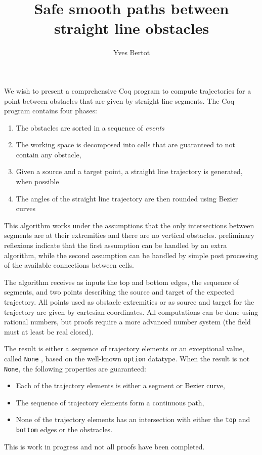 \documentclass{easychair}
\title{Safe smooth paths between straight line obstacles}
\author{Yves Bertot}
\institute{Inria Université Côte d'Azur}
\begin{document}
\maketitle
We wish to present a comprehensive Coq program
to compute trajectories for a point between obstacles that are given by straight
line segments.  The Coq program contains four phases:
\begin{enumerate}
\item The obstacles are sorted in a sequence of {\em events}
\item The working space is decomposed into cells that are guaranteed to not contain
 any obstacle,
\item Given a source and a target point, a straight line trajectory is generated,
when possible
\item The angles of the straight line trajectory are then rounded using Bezier curves
\end{enumerate}
This algorithm works under the assumptions that the only intersections between segments
are at their extremities and there are no vertical obstacles.  preliminary reflexions
indicate that the first assumption can be handled by an extra algorithm, while
the second assumption can be handled by simple post processing of the available
connections between cells.

The algorithm receives as inputs the top and bottom edges, the sequence of segments,
and two points describing the source and target of the expected trajectory.  All
points used as obstacle extremities or as source and target for the trajectory are
given by cartesian coordinates.  All computations can be done using rational numbers,
but proofs require a more advanced number system (the field must at least
be real closed).

The result is either a sequence of trajectory elements or an exceptional value, called
{\tt None} , based
on the well-known {\tt option} datatype.  When the result is not {\tt None},
the following properties are guaranteed:
\begin{itemize}
\item Each of the trajectory elements is either a segment or Bezier curve,
\item The sequence of trajectory elements form a continuous path,
\item None of the trajectory elements has an intersection with either
the {\tt top} and {\tt bottom} edges or the obstracles.
\end{itemize}
This is work in progress and not all proofs have been completed.
\end{document}
